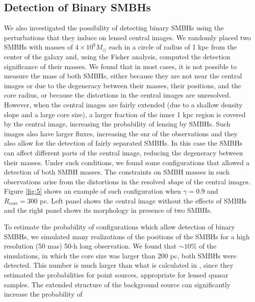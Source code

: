 \documentclass[chicago]{emulateapj}
\begin{document}
\subsection{Detection of Binary SMBHs}
We also investigated the possibility of detecting binary SMBHs using the perturbations that they induce on lensed central images. 
We randomly placed two SMBHs with masses of $4\times10^8 M_{\odot}$ each in a circle of radius of 1 kpc from the center of the galaxy and, using the Fisher analysis, computed the detection significance of their masses. We found that in most cases, it is not possible to measure the mass of both SMBHs, either because they are not near the central images or due to the degeneracy between their masses, their positions, and the core radius, or because the distortions in the central images are unresolved.
However, when the central images are fairly extended (due to a shallow density slope and a large core size), a larger fraction of the inner 1 kpc region is covered by the central image, increasing the probability of lensing by SMBHs. Such images also have larger fluxes, increasing the snr of the observations and they also allow for the detection of fairly separated SMBHs. In this case the SMBHs can affect different parts of the central image, reducing the degeneracy between their masses.
Under such conditions, we found some configurations that allowed a detection of both SMBH masses. The constraints on SMBH masses in such observations arise from the distortions in the resolved \emph{shape} of the central images. Figure \ref{fig:5} shows an example of such configuration when $\gamma = 0.9$ and $R_{\mathrm{core}}=300$ pc. Left panel shows the central image without the effects of SMBHs and the right panel shows its morphology in presence of two SMBHs. 




To estimate the probability of configurations which allow detection of binary SMBHs, we simulated many realizations of the positions of the SMBHs for a high resolution (50 mas) 50-h long observation. 
We found that $\sim10\%$ of the simulations, in which the core size was larger than 200 pc, both SMBHs were detected. 
This number is much larger than what is calculated in \citet{Li:12}, since they estimated  the probabilities for point sources, appropriate for lensed quasar samples. The extended structure of the background source can significantly increase the probability of 
\end{document}
